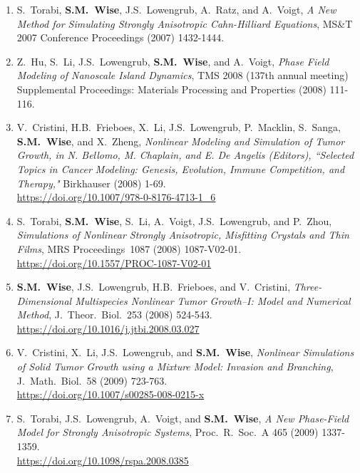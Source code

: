 \documentclass[10pt,letterpaper]{article}
\begin{document}
\begin{enumerate}
	\item
S.~Torabi, \textbf{S.M.~Wise}, J.S.~Lowengrub, A.~Ratz, and A.~Voigt, {\sl A New Method for Simulating Strongly Anisotropic Cahn-Hilliard Equations}, MS\&T 2007 Conference Proceedings (2007) 1432-1444.	

	\item
Z.~Hu, S.~Li, J.S.~Lowengrub, \textbf{S.M.~Wise}, and A.~Voigt, {\sl Phase Field Modeling of Nanoscale Island Dynamics}, TMS 2008 (137th annual meeting) Supplemental Proceedings: Materials Processing and Properties (2008) 111-116.

	\item
V.~Cristini, H.B.~Frieboes, X.~Li, J.S.~Lowengrub, P.~Macklin, S.~Sanga, \textbf{S.M.~Wise}, and X.~Zheng, {\sl Nonlinear Modeling and Simulation of Tumor Growth, in N. Bellomo, M. Chaplain, and E. De Angelis (Editors), ``Selected Topics in Cancer Modeling: Genesis, Evolution, Immune Competition, and Therapy,"}  Birkhauser (2008) 1-69.
	\\
\url{https://doi.org/10.1007/978-0-8176-4713-1_6}

	\item
S.~Torabi, \textbf{S.M.~Wise}, S.~Li, A.~Voigt, J.S.~Lowengrub, and P.~Zhou, {\sl Simulations of Nonlinear Strongly Anisotropic, Misfitting Crystals and Thin Films}, MRS Proceedings~1087 (2008) 1087-V02-01. 
	\\
\url{https://doi.org/10.1557/PROC-1087-V02-01}

	\item
\textbf{S.M.~Wise}, J.S.~Lowengrub, H.B.~Frieboes, and V.~Cristini, {\sl Three-Dimensional Multispecies Nonlinear Tumor Growth--I: Model and Numerical Method}, J.~Theor.~Biol.~253 (2008) 524-543.
	\\
\url{https://doi.org/10.1016/j.jtbi.2008.03.027}

	\item
V.~Cristini, X.~Li, J.S.~Lowengrub, and \textbf{S.M.~Wise}, {\sl Nonlinear Simulations of Solid Tumor Growth using a Mixture Model: Invasion and Branching}, J.~Math.~Biol.~58 (2009) 723-763.
	\\
\url{https://doi.org/10.1007/s00285-008-0215-x}

	\item
S.~Torabi, J.S.~Lowengrub, A.~Voigt, and \textbf{S.M.~Wise}, {\sl A New Phase-Field Model for Strongly Anisotropic Systems}, Proc.~R.~Soc.~A 465 (2009) 1337-1359.
	\\
\url{https://doi.org/10.1098/rspa.2008.0385}



\end{enumerate}
\end{document}
